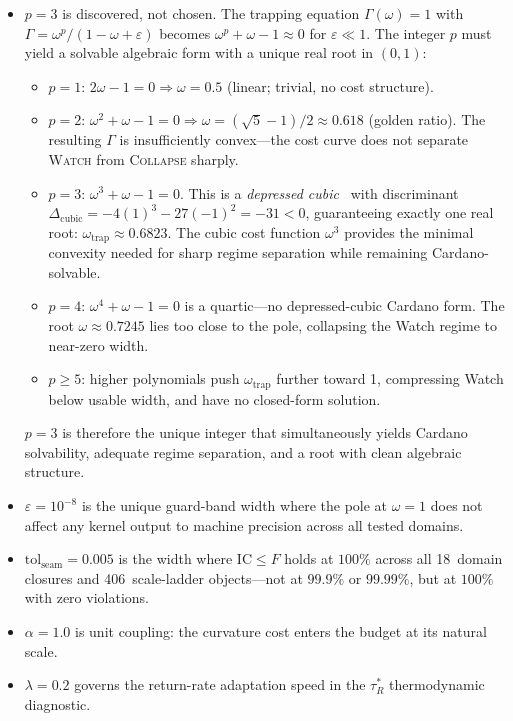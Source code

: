 \documentclass[
  aps,
  prd,
  twocolumn,
  superscriptaddress,
  nofootinbib,
  floatfix
]{revtex4-2}
\newcommand{\tRS}{\tau_{\!R}^{*}}
\newcommand{\Gam}{\Gamma}
\newcommand{\eps}{\varepsilon}
\newcommand{\tolseam}{\mathrm{tol}_{\mathrm{seam}}}
\newcommand{\regime}[1]{\textrm{\scshape#1}}
\newcommand{\IC}{\mathrm{IC}}
\begin{document}
\begin{itemize}[leftmargin=*]
\item $p = 3$ is discovered, not chosen.  The trapping equation
  $\Gam(\omega) = 1$ with $\Gam = \omega^p/(1 - \omega + \eps)$
  becomes $\omega^p + \omega - 1 \approx 0$ for $\eps \ll 1$.
  The integer $p$ must yield a solvable algebraic form with a
  unique real root in $(0,1)$:
  \begin{itemize}[leftmargin=*]
  \item $p = 1$: $2\omega - 1 = 0 \Rightarrow \omega = 0.5$
    (linear; trivial, no cost structure).
  \item $p = 2$: $\omega^2 + \omega - 1 = 0 \Rightarrow
    \omega = (\sqrt{5}-1)/2 \approx 0.618$ (golden ratio).
    The resulting $\Gam$ is insufficiently convex---the cost
    curve does not separate \regime{Watch} from \regime{Collapse}
    sharply.
  \item $p = 3$: $\omega^3 + \omega - 1 = 0$.  This is a
    \emph{depressed cubic}~\cite{cardano1545} with discriminant
    $\Delta_{\mathrm{cubic}} = -4(1)^3 - 27(-1)^2 = -31 < 0$,
    guaranteeing exactly one real root:
    $\omega_{\mathrm{trap}} \approx 0.6823$.
    The cubic cost function $\omega^3$ provides the minimal
    convexity needed for sharp regime separation while remaining
    Cardano-solvable.
  \item $p = 4$: $\omega^4 + \omega - 1 = 0$ is a quartic---no
    depressed-cubic Cardano form.  The root
    $\omega \approx 0.7245$ lies too close to the pole,
    collapsing the Watch regime to near-zero width.
  \item $p \geq 5$: higher polynomials push $\omega_\mathrm{trap}$
    further toward 1, compressing Watch below usable width,
    and have no closed-form solution.
  \end{itemize}
  $p = 3$ is therefore the unique integer that simultaneously
  yields Cardano solvability, adequate regime separation, and
  a root with clean algebraic structure.

\item $\eps = 10^{-8}$ is the unique guard-band width where the
  pole at $\omega = 1$ does not affect any kernel output to machine
  precision across all tested domains.

\item $\tolseam = 0.005$ is the width where $\IC \leq F$ holds at
  $100\%$ across all 18~domain closures and 406~scale-ladder
  objects---not at $99.9\%$ or $99.99\%$, but at $100\%$ with zero
  violations.

\item $\alpha = 1.0$ is unit coupling: the curvature cost
  enters the budget at its natural scale.

\item $\lambda = 0.2$ governs the return-rate adaptation speed in
  the $\tRS$ thermodynamic diagnostic.
\end{itemize}
\end{document}
